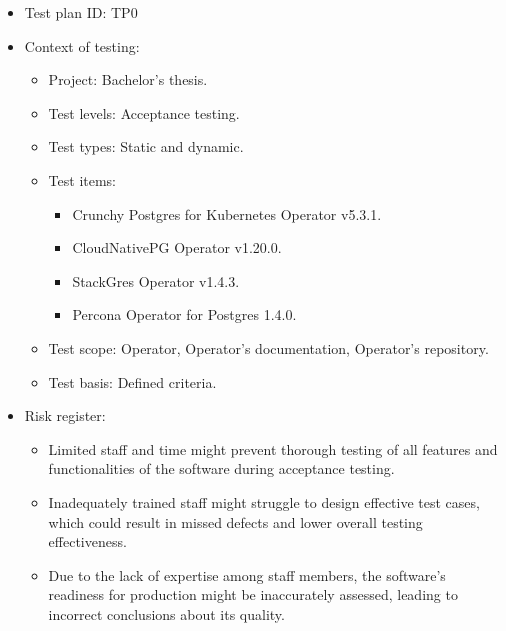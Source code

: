 
\listofappendices


\label{chap:generalTestPlan}

\begin{itemize}
    \item Test plan ID: TP0
    \item Context of testing:
          \begin{itemize}
              \item Project: Bachelor’s thesis.
              \item Test levels: Acceptance testing.
              \item Test types: Static and dynamic.
              \item Test items:
                    \begin{itemize}
                        \item Crunchy Postgres for Kubernetes Operator v5.3.1.
                        \item CloudNativePG Operator v1.20.0.
                        \item StackGres Operator v1.4.3.
                        \item Percona Operator for Postgres 1.4.0.
                    \end{itemize}
              \item Test scope: Operator, Operator’s documentation, Operator’s repository.
              \item Test basis: Defined criteria.
          \end{itemize}
    \item Risk register:
          \begin{itemize}
              \item Limited staff and time might prevent thorough testing of all features and functionalities of the software during acceptance testing.
              \item Inadequately trained staff might struggle to design effective test cases, which could result in missed defects and lower overall testing effectiveness.
              \item Due to the lack of expertise among staff members, the software's readiness for production might be inaccurately assessed, leading to incorrect conclusions about its quality.

\end{itemize}
\end{itemize}

